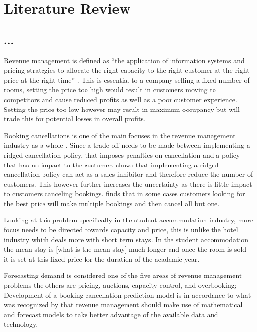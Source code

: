\chapter{Literature Review}
\label{ch:lit_rev}
\section{...}
Revenue management is defined as “the application of information systems and pricing strategies to allocate the right capacity to the right customer at the right price at the right time” \cite{Kimes2003HasAcceptable}. This is essential to a company selling a fixed number of rooms, setting the price too high would result in customers moving to competitors and cause reduced profits as well as a poor customer experience. Setting the price too low however may result in maximum occupancy but will trade this for potential losses in overall profits.

\vspace{5mm}

Booking cancellations is one of the main focuses in the revenue management industry as a whole \cite{Subramanian1999AirlineNo-shows}. Since a trade-off needs to be made between implementing a ridged cancellation policy, that imposes penalties on cancellation and a policy that has no impact to the customer. \cite{Jinhong2007ServiceCancellations} shows that implementing a ridged cancellation policy can act as a sales inhibitor and therefore reduce the number of customers. This however further increases the uncertainty as there is little impact to customers canceling bookings. \cite{Talluri2004TheManagement} finds that in some cases customers looking for the best price will make multiple bookings and then cancel all but one. 

\vspace{5mm}

Looking at this problem specifically in the student accommodation industry, more focus needs to be directed towards capacity and price, this is unlike the hotel industry which deals more with short term stays. In the student accommodation the mean stay is [what is the mean stay] much longer and once the room is sold it is set at this fixed price for the duration of the academic year.
 \vspace{5mm}
 
 Forecasting demand is considered one of the five areas of revenue management problems the others are pricing, auctions, capacity control, and overbooking; \cite{Chiang2007AnResearch}  Development of a booking cancellation prediction model is in accordance to what was recognized by \cite{Chiang2007AnResearch} that revenue management should make use of mathematical and forecast models to take better advantage of the available data and technology.
 
